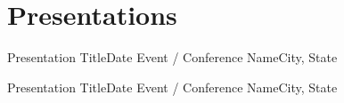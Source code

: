 \section{Presentations}
  \resumeSubHeadingListStart

    \resumeSubheading
      {Presentation Title}{Date}
      {Event / Conference Name}{City, State}
      \resumeItemListStart
      \resumeItemListEnd

    \resumeSubheading
      {Presentation Title}{Date}
      {Event / Conference Name}{City, State}
      \resumeItemListStart
      \resumeItemListEnd

  \resumeSubHeadingListEnd
